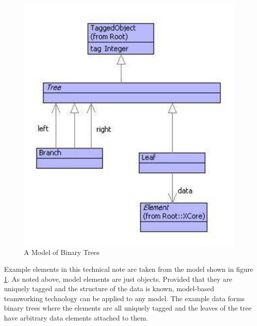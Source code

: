 %
\begin{figure}
\begin{center}

\includegraphics[width=12cm]{Programming/Teams/Images/Trees.pdf}

\caption{A Model of Binary Trees\label{fig:Binary Trees}}
\end{center}
\end{figure}


Example elements in this technical note are taken from the model shown
in figure \ref{fig:Binary Trees}. As noted above, model elements
are just objects. Provided that they are uniquely tagged and the structure
of the data is known, model-based teamworking technology can be applied
to any model. The example data forms binary trees where the elements
are all uniquely tagged and the leaves of the tree have arbitrary
data elements attached to them.

